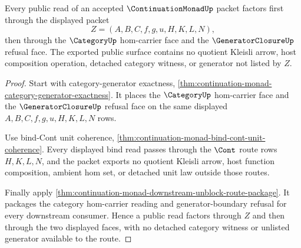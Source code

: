 \begin{theorem}
\label{thm:continuation-monad-generator-category-public-factorization}
Every public read of an accepted $\ContinuationMonadUp$ packet factors first
through the displayed packet
$$
Z=(A,B,C,f,g,u,H,K,L,N),
$$
then through the $\CategoryUp$ hom-carrier face and the
$\GeneratorClosureUp$ refusal face. The exported public surface contains no
quotient Kleisli arrow, host composition operation, detached category
witness, or generator not listed by $Z$.
\end{theorem}
\begin{proof}
Start with category-generator exactness,
\autoref{thm:continuation-monad-category-generator-exactness}. It places the
$\CategoryUp$ hom-carrier face and the $\GeneratorClosureUp$ refusal face on
the same displayed $A,B,C,f,g,u,H,K,L,N$ rows.

Use bind-Cont unit coherence,
\autoref{thm:continuation-monad-bind-cont-unit-coherence}. Every displayed
bind read passes through the $\Cont$ route rows $H,K,L,N$, and the packet
exports no quotient Kleisli arrow, host function composition, ambient hom
set, or detached unit law outside those routes.

Finally apply
\autoref{thm:continuation-monad-downstream-unblock-route-package}. It packages
the category hom-carrier reading and generator-boundary refusal for every
downstream consumer. Hence a public read factors through $Z$ and then through
the two displayed faces, with no detached category witness or unlisted
generator available to the route.
\end{proof}
